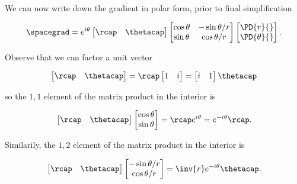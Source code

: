 We can now write down the gradient in polar form, prior to final simplification

\begin{align}\label{eqn:divGradCurLap:4a}
\spacegrad 
= 
e^{i\theta}
\begin{bmatrix}
\rcap & \thetacap
\end{bmatrix}
\begin{bmatrix}
\cos\theta & -\sin\theta/r \\
\sin\theta & \cos\theta/r
\end{bmatrix}
\begin{bmatrix}
\PD{r}{} \\
\PD{\theta}{} 
\end{bmatrix}.
\end{align}

Observe that we can factor a unit vector 

\begin{align}\label{eqn:divGradCurLap:9}
\begin{bmatrix}
\rcap & \thetacap
\end{bmatrix}
=
\rcap
\begin{bmatrix}
1 & i
\end{bmatrix}
=
\begin{bmatrix}
i & 1
\end{bmatrix}
\thetacap
\end{align}

so the $1,1$ element of the matrix product in the interior is

\begin{align}\label{eqn:divGradCurLap:9a}
\begin{bmatrix}
\rcap & \thetacap
\end{bmatrix}
\begin{bmatrix}
\cos\theta \\
\sin\theta 
\end{bmatrix}
=
\rcap e^{i\theta} = e^{-i\theta}\rcap.
\end{align}

Similarily, the $1,2$ element of the matrix product in the interior is

\begin{align}\label{eqn:divGradCurLap:9b}
\begin{bmatrix}
\rcap & \thetacap
\end{bmatrix}
\begin{bmatrix}
-\sin\theta/r \\
\cos\theta/r
\end{bmatrix}
=
\inv{r} e^{-i\theta} \thetacap.
\end{align}


